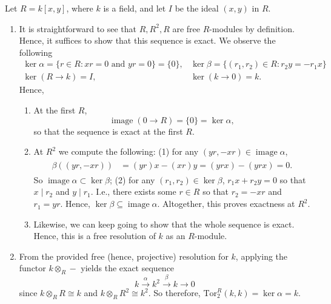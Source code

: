 \documentclass{article}
\newcommand{\tor}{\text{Tor}}
\begin{document}
	Let $R = k[x,y]$, where $k$ is a field, and let $I$ be the ideal $(x, y)$ in $R$. \vspace{-0.25cm}
	\begin{enumerate}[itemsep =-2pt,label  = (\alph{*})]
		\item It is straightforward to see that $R, R^{2}, R$ are free $R$-modules by definition. Hence, it suffices to show that this sequence is exact. We observe the following 
		\begin{equation*}
			\begin{matrix}
				\ker{\alpha} = \{r \in R: xr = 0 \text{ and } yr = 0\} = \{0\}, & \ker{\beta} = \{(r_{1}, r_{2}) \in R: r_{2}y = -r_{1}x\} \\ 
				\ker(R \to k)  = I, & \ker(k \to 0) = k. 
			\end{matrix}
		\end{equation*} 
		Hence, 
		\begin{enumerate}[itemsep =-2pt,label = (\roman{*})]
			\item At the first $R$, 
			\begin{equation*}
				\operatorname{image}(0 \to R) = \{0\} = \ker{\alpha}, 
			\end{equation*}
			so that the sequence is exact at the first $R$. 
			\item At $R^{2}$ we compute the following: (1) for any $(yr, -xr) \in \operatorname{image}{\alpha}$, 
			\begin{align*}
				\begin{split}
					\beta((yr, -xr)) &= (yr)x - (xr)y =(yrx)- (yrx) = 0. 
				\end{split}
			\end{align*}
			So $\operatorname{image}{\alpha} \subset \operatorname{ker}{\beta}$; (2) for any $(r_{1}, r_{2}) \in \ker{\beta}$, $r_{1}x + r_{2}y = 0$ so that $x \mid r_{2}$ and $y \mid r_{1}$. I.e., there exists some $r \in R$ so that $r_{2} = -xr$ and $r_{1} = yr$. Hence, $\operatorname{ker}{\beta} \subseteq \operatorname{image}{\alpha}$. Altogether, this proves exactness at $R^{2}$. 
			\item Likewise, we can keep going to show that the whole sequence is exact. Hence, this is a free resolution of $k$ as an $R$-module. 
		\end{enumerate}
		\item From the provided free (hence, projective) resolution for $k$, applying the functor $k \otimes_{R} -$ yields the exact sequence 
		\begin{equation*}
			k \xrightarrow{\alpha} k^{2} \xrightarrow{\beta} k \to 0
		\end{equation*}
		since $k \otimes_{R} R \cong k$ and $k \otimes_{R} R^{2} \cong k^{2}$. So therefore, $\tor_{2}^{R}(k,k) = \ker{\alpha} = k$. 
	\end{enumerate}
	
\end{document}
